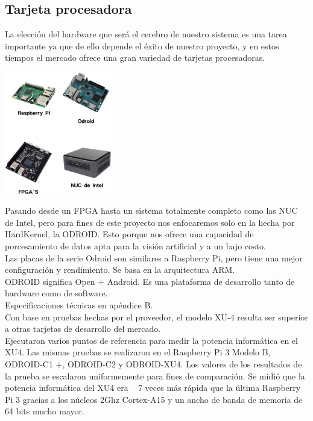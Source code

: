 \subsection{Tarjeta procesadora}
La elección del hardware que será el cerebro de nuestro sistema es una tarea importante ya que de ello depende el éxito de
nuestro proyecto, y en estos tiempos el mercado ofrece una gran variedad de tarjetas procesadoras.
\begin{center}
    \includegraphics[width=0.35\textwidth]{Capitulo2/Fig7.eps}
    \label{Fig7}
\end{center}
Pasando desde un FPGA hasta un sistema totalmente completo como las NUC de Intel, pero para fines de este proyecto nos enfocaremos
solo en la hecha por HardKernel, la ODROID. Esto porque nos ofrece una capacidad de porcesamiento de datos apta para la visión
artificial y a un bajo costo.\\
Las placas de la serie Odroid son similares a Raspberry Pi, pero tiene una mejor
configuración y rendimiento. Se basa en la arquitectura ARM.~\cite{ROSLENTIN}\\
ODROID significa Open + Android. Es una plataforma de desarrollo tanto de
hardware como de software.\\
Especificaciones técnicas en apéndice B.\\
Con base en pruebas hechas por el proveedor, el modelo XU-4 resulta ser superior
a otras tarjetas de desarrollo del mercado.\\
Ejecutaron varios puntos de referencia para medir la potencia informática en el XU4.
Las mismas pruebas se realizaron en el Raspberry Pi 3 Modelo B, ODROID-C1 +, ODROID-C2
y ODROID-XU4.
Los valores de los resultados de la prueba se escalaron uniformemente para fines de
comparación. Se midió que la potencia informática del XU4 era ~ 7 veces más rápida que
la última Raspberry Pi 3 gracias a los núcleos 2Ghz Cortex-A15 y un ancho de banda de
memoria de 64 bits mucho mayor.\\
